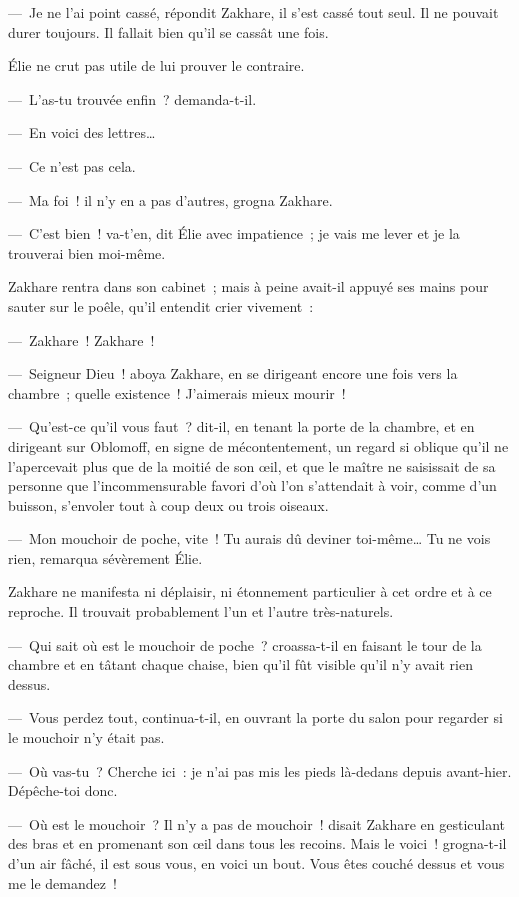 \documentclass[french,twoside]{book} %
\begin{document}
— Je ne l’ai point cassé, répondit Zakhare, il s’est cassé tout seul. Il ne pouvait durer toujours. Il fallait bien qu’il se cassât une fois.\par
Élie ne crut pas utile de lui prouver le contraire.\par
— L’as-tu trouvée enfin ? demanda-t-il.\par
— En voici des lettres…\par
— Ce n’est pas cela.\par
— Ma foi ! il n’y en a pas d’autres, grogna Zakhare.\par
— C’est bien ! va-t’en, dit Élie avec impatience ; je vais me lever et je la trouverai bien moi-même.\par
Zakhare rentra dans son cabinet ; mais à peine avait-il appuyé ses mains pour sauter sur le poêle, qu’il entendit crier vivement :\par
— Zakhare ! Zakhare !\par
— Seigneur Dieu ! aboya Zakhare, en se dirigeant encore une fois vers la chambre ; quelle existence ! J’aimerais mieux mourir !\par
— Qu’est-ce qu’il vous faut ? dit-il, en tenant la porte de la chambre, et en dirigeant sur Oblomoff, en signe de mécontentement, un regard si oblique qu’il ne l’apercevait plus que de la moitié de son œil, et que le maître ne saisissait de sa personne que l’incommensurable favori d’où l’on s’attendait à voir, comme d’un buisson, s’envoler tout à coup deux ou trois oiseaux.\par
— Mon mouchoir de poche, vite ! Tu aurais dû deviner toi-même… Tu ne vois rien, remarqua sévèrement Élie.\par
Zakhare ne manifesta ni déplaisir, ni étonnement particulier à cet ordre et à ce reproche. Il trouvait probablement l’un et l’autre très-naturels.\par
— Qui sait où est le mouchoir de poche ? croassa-t-il en faisant le tour de la chambre et en tâtant chaque chaise, bien qu’il fût visible qu’il n’y avait rien dessus.\par
— Vous perdez tout, continua-t-il, en ouvrant la porte du salon pour regarder si le mouchoir n’y était pas.\par
— Où vas-tu ? Cherche ici : je n’ai pas mis les pieds là-dedans depuis avant-hier. Dépêche-toi donc.\par
— Où est le mouchoir ? Il n’y a pas de mouchoir ! disait Zakhare en gesticulant des bras et en promenant son œil dans tous les recoins. Mais le voici ! grogna-t-il d’un air fâché, il est sous vous, en voici un bout. Vous êtes couché dessus et vous me le demandez !\par
\end{document}
